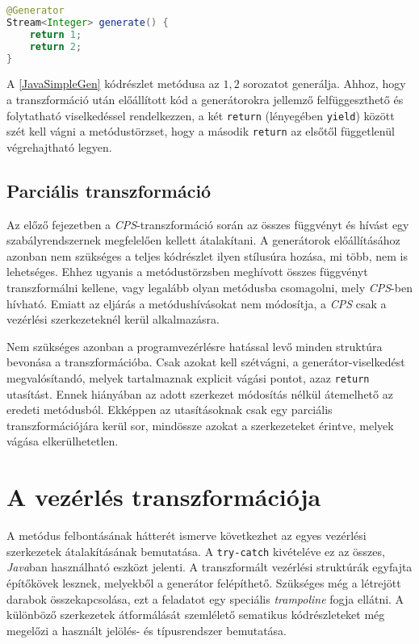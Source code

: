 \begin{lstlisting}[language=Java, caption={Az $1, 2$ sorozatot előállító generátor}, captionpos=b, label=JavaSimpleGen, escapechar=$]
@Generator
Stream<Integer> generate() {
    return 1;
    return 2;
}
\end{lstlisting}

A \ref{JavaSimpleGen} kódrészlet metódusa az $1, 2$ sorozatot generálja. Ahhoz, hogy a transzformáció után előállított kód a generátorokra jellemző felfüggeszthető és folytatható viselkedéssel rendelkezzen, a két \texttt{return} (lényegében \texttt{yield}) között szét kell vágni a metódustörzset, hogy a második \texttt{return} az elsőtől függetlenül végrehajtható legyen.

\subsection{Parciális transzformáció}

Az előző fejezetben a \textit{CPS}-transzformáció során az összes függvényt és hívást egy szabályrendszernek megfelelően kellett átalakítani. A generátorok előállításához azonban nem szükséges a teljes kódrészlet ilyen stílusúra hozása, mi több, nem is lehetséges. Ehhez ugyanis a metódustörzsben meghívott összes függvényt transzformálni kellene, vagy legalább olyan metódusba csomagolni, mely \textit{CPS}-ben hívható. Emiatt az eljárás a metódushívásokat nem módosítja, a \textit{CPS} csak a vezérlési szerkezeteknél kerül alkalmazásra.

Nem szükséges azonban a programvezérlésre hatással levő minden struktúra bevonása a transzformációba. Csak azokat kell szétvágni, a generátor-viselkedést megvalósítandó, melyek tartalmaznak explicit vágási pontot, azaz \texttt{return} utasítást. Ennek hiányában az adott szerkezet módosítás nélkül átemelhető az eredeti metódusból. Ekképpen az utasításoknak csak egy parciális transzformációjára kerül sor, mindössze azokat a szerkezeteket érintve, melyek vágása elkerülhetetlen.

\section{A vezérlés transzformációja}

A metódus felbontásának hátterét ismerve következhet az egyes vezérlési szerkezetek átalakításának bemutatása. A \texttt{try-catch} kivételéve ez az összes, \textit{Java}ban használható eszközt jelenti. A transzformált vezérlési struktúrák egyfajta építőkövek lesznek, melyekből a generátor felépíthető. Szükséges még a létrejött darabok összekapcsolása, ezt a feladatot egy speciális \textit{trampoline} fogja ellátni. A különböző szerkezetek átformálását szemlélető sematikus kódrészleteket még megelőzi a használt jelölés- és típusrendszer bemutatása.


